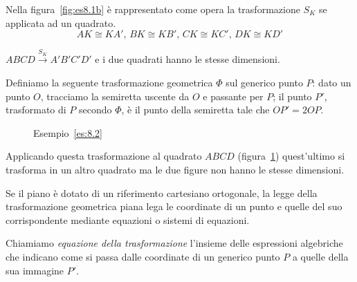 \begin{exrig}
\begin{esempio}
Nella figura~\ref{fig:es8.1b} è rappresentato come opera la 
trasformazione \(S_K\) se applicata ad un quadrato.
\[AK\cong KA'\text{, }BK\cong KB'\text{, }CK\cong KC'\text{, }DK\cong 
KD'\]

\(ABCD\overset{S_K}{\rightarrow}A'B'C'D'\) e i due quadrati hanno le 
stesse dimensioni.
\end{esempio}

\begin{esempio}\label{es:8.2}
Definiamo la seguente trasformazione geometrica \(\Phi\) sul generico 
punto \(P\): dato un punto \(O\), tracciamo la semiretta uscente da \(O\) e 
passante per \(P\); il punto \(P'\), trasformato di \(P\) secondo \(\Phi\), è 
il punto della semiretta tale che \(OP'=2OP\).\vspace{7pt}


\begin{inaccessibleblock}
 \begin{figure}[!htb]
    \centering
	\caption{Esempio~\ref{es:8.2}}\label{fig:es8.2}
\end{figure}
\end{inaccessibleblock}

Applicando questa trasformazione al quadrato \(ABCD\) 
(figura~\ref{fig:es8.2}) quest'ultimo si trasforma in un altro 
quadrato ma le due figure non hanno le stesse dimensioni.
\end{esempio}
\end{exrig}

Se il piano è dotato di un riferimento cartesiano ortogonale, la 
legge della trasformazione geometrica piana lega le coordinate di un 
punto e quelle del suo corrispondente mediante equazioni o sistemi di 
equazioni.
 
\begin{definizione}
Chiamiamo \emph{equazione della trasformazione} l'insieme delle 
espressioni algebriche che indicano come si passa dalle coordinate di 
un generico punto \(P\) a quelle della sua immagine \(P'\).
\end{definizione}

